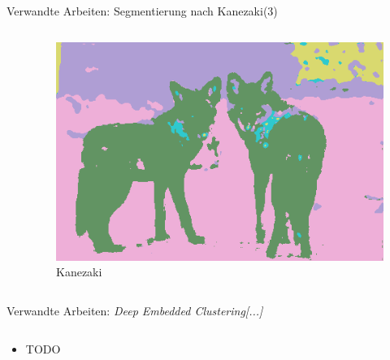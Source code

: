 \documentclass[9pt]{beamer}
\begin{document}
\begin{frame}{Verwandte Arbeiten: Segmentierung nach Kanezaki\footnotemark[1] (3)}
\begin{columns}
\begin{column}{.33\textwidth}
	\end{column}
	\begin{column}{.33\textwidth}
		\begin{figure}
			\includegraphics[width=\textwidth,keepaspectratio]{kanezaki_out.png}
			\caption{Kanezaki}
		\end{figure}
	\end{column}
\end{columns}

\end{frame}

\begin{frame}{Verwandte Arbeiten: \textit{Deep Embedded Clustering[...]}}
	\begin{columns}
		\begin{column}{.5\textwidth}
			\begin{itemize}
				\item TODO
			\end{itemize}
		\end{column}
		\begin{column}{.5\textwidth}
			\begin{figure}
				
			\end{figure}
		\end{column}
	\end{columns}
\end{frame}
\end{document}

